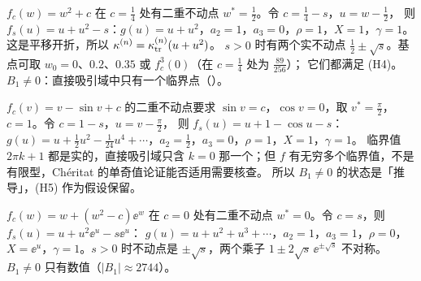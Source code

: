 \begin{example}[$w^2+c$]\label{ch10:ex:quad}
$f_c(w)=w^2+c$ 在 $c=\tfrac14$ 处有二重不动点 $w^*=\tfrac12$。令 $c=\tfrac14-s$，$u=w-\tfrac12$，
则 $f_s(u)=u+u^2-s$：$g(u)=u+u^2$，$a_2=1$，$a_3=0$，$\rho=1$，$X=1$，$\gamma=1$。这是平移开折，所以 $\kappa^{(n)}=\kappa_{\mathrm{tr}}^{(n)}(u+u^2)$。
$s>0$ 时有两个实不动点 $\tfrac12\pm\sqrt s$。基点可取 $w_0=0$、$0.2$、$0.35$ 或 $f_c^3(0)$（在 $c=\tfrac14$ 处为 $\tfrac{89}{256}$）；
它们都满足 (H4)。$B_1\neq0$：直接吸引域中只有一个临界点（\cite[注~9.5]{KneserPaper}）。
\end{example}

\begin{example}[$v-\sin v+c$]\label{ch10:ex:sine}
$f_c(v)=v-\sin v+c$ 的二重不动点要求 $\sin v=c$，$\cos v=0$，取 $v^*=\tfrac\pi2$，$c=1$。令 $c=1-s$，$u=v-\tfrac\pi2$，
则 $f_s(u)=u+1-\cos u-s$：$g(u)=u+\tfrac12u^2-\tfrac1{24}u^4+\cdots$，$a_2=\tfrac12$，$a_3=0$，$\rho=1$，$X=1$，$\gamma=1$。
临界值 $2\pi k+1$ 都是实的，直接吸引域只含 $k=0$ 那一个；但 $f$ 有无穷多个临界值，不是有限型，Chéritat 的单奇值论证能否适用需要核查。
所以 $B_1\neq0$ 的状态是「推导」，(H5) 作为假设保留。
\end{example}

\begin{example}[$w+(w^2-c)\ee^w$]\label{ch10:ex:expq}
$f_c(w)=w+(w^2-c)\ee^w$ 在 $c=0$ 处有二重不动点 $w^*=0$。令 $c=s$，则 $f_s(u)=u+u^2\ee^u-s\ee^u$：
$g(u)=u+u^2+u^3+\cdots$，$a_2=1$，$a_3=1$，$\rho=0$，$X=\ee^u$，$\gamma=1$。$s>0$ 时不动点是 $\pm\sqrt s$，两个乘子 $1\pm2\sqrt s\,\ee^{\pm\sqrt s}$ 不对称。
$B_1\neq0$ 只有数值（$|B_1|\approx2744$）。
\end{example}


